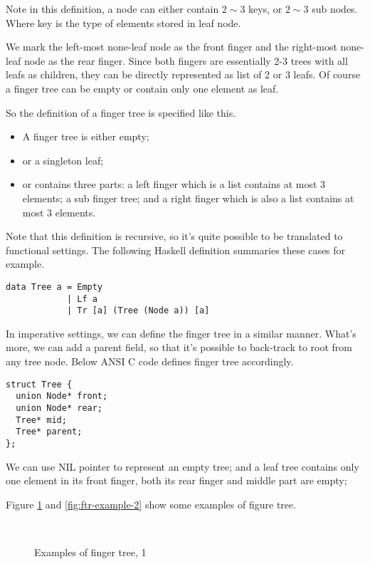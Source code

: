 \documentclass[UTF8]{article}
\begin{document}
Note in this definition, a node can either contain $2 \sim 3$ keys, or $2 \sim 3$ sub nodes.
Where key is the type of elements stored in leaf node.

We mark the left-most none-leaf node as the front finger and the right-most
none-leaf node as the rear finger. Since both fingers are essentially
2-3 trees with all leafs as children, they can be directly represented as
list of 2 or 3 leafs. Of course a finger tree can be empty or contain
only one element as leaf.

So the definition of a finger tree is specified like this.

\begin{itemize}
\item A finger tree is either empty;
\item or a singleton leaf;
\item or contains three parts: a left finger which is a list contains at most
3 elements; a sub finger tree; and a right finger which is also a list contains
at most 3 elements.
\end{itemize}

Note that this definition is recursive, so it's quite possible to be translated
to functional settings. The following Haskell definition summaries these cases
for example.

\lstset{language=Haskell}
\begin{lstlisting}
data Tree a = Empty
            | Lf a
            | Tr [a] (Tree (Node a)) [a]
\end{lstlisting}

In imperative settings, we can define the finger tree in a similar manner. What's more,
we can add a parent field, so that it's possible to back-track to root from any tree node.
Below ANSI C code defines finger tree accordingly.

\lstset{language=C}
\begin{lstlisting}
struct Tree {
  union Node* front;
  union Node* rear;
  Tree* mid;
  Tree* parent;
};
\end{lstlisting}

We can use NIL pointer to represent an empty tree; and a leaf tree contains only one element
in its front finger, both its rear finger and middle part are empty;

Figure \ref{fig:ftr-example-1} and \ref{fig:ftr-example-2} show some examples
of figure tree.

\begin{figure}[htbp]
  \centering
   \\
  \caption{Examples of finger tree, 1} \label{fig:ftr-example-1}
\end{figure}
\end{document}
